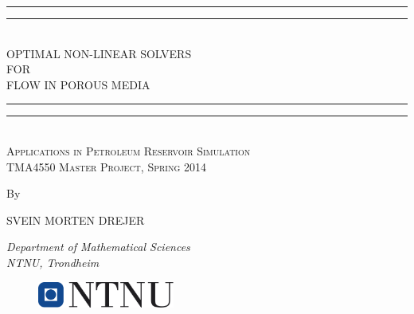 \documentclass[a4paper,12pt,twoside,openright]{report}
\numberwithin{equation}{section}
\begin{document}
\begin{titlepage}
\centering %
\vspace*{\baselineskip} %

\rule{\textwidth}{1.6pt}\vspace*{-\baselineskip}\vspace*{2pt} %
\rule{\textwidth}{0.4pt}\\[\baselineskip] %

{\LARGE OPTIMAL NON-LINEAR SOLVERS \\FOR \\[0.3\baselineskip] FLOW IN POROUS MEDIA}\\[0.2\baselineskip] %
\rule{\textwidth}{0.4pt}\vspace*{-\baselineskip}\vspace{3.2pt} %
\rule{\textwidth}{1.6pt}\\[\baselineskip] %

\scshape %
Applications in Petroleum Reservoir Simulation \\ %
[\baselineskip] %
TMA4550 Master Project, Spring 2014\par %

\vspace*{2\baselineskip} %

By \\[\baselineskip]
{\Large SVEIN MORTEN DREJER\par} %
{\itshape Department of Mathematical Sciences \\
NTNU, Trondheim\par} %

\vfill %

\begin{figure}[h] %
\begin{center}
\includegraphics[width=4.5cm]{figures/ntnuLogo.png}  
\end{center}
\end{figure}
\end{titlepage}
\end{document}
